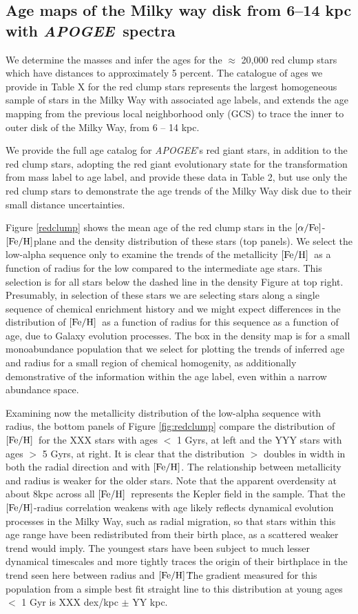 \documentclass[12pt, preprint]{aastex}
\newcommand{\project}[1]{\textsl{#1}}
\newcommand{\apogee}{\project{APOGEE}}
\newcommand{\feh}{\mbox{$\rm [Fe/H]$}}
\newcommand{\alphafe}{\mbox{$\rm [\alpha/Fe]$}}
\begin{document}
\subsection{Age maps of the Milky way disk from 6--14 kpc with \apogee\ spectra}

We determine the masses and infer the ages for the $\approx$ 20,000 red clump stars which have distances to approximately 5 percent. The catalogue of ages we provide in Table X for the red clump stars represents the largest homogeneous sample of stars in the Milky Way with associated age labels, and extends the age mapping from the previous local neighborhood only (GCS) to trace the inner to outer disk of the Milky Way, from 6 -- 14 kpc.  

We provide the full age catalog for \apogee's red giant stars, in addition to the red clump stars, adopting the red giant evolutionary state for the transformation from mass label to age label, and provide these data in Table 2, but use only the red clump stars to demonstrate the age trends of the Milky Way disk due to their small distance uncertainties. 


Figure \ref{redclump} shows the mean age of the red clump stars in the \alphafe-\feh plane and the density distribution of these stars (top panels).  We select the low-alpha sequence only to examine the trends of the metallicity \feh\ as a function of radius for the low compared to the intermediate age stars. This selection is for all stars below the dashed line in the density Figure at top right. Presumably, in selection of these stars we are selecting stars along a single sequence of chemical enrichment history and we might expect differences in the distribution of \feh\ as a function of radius for this sequence as a function of age, due to Galaxy evolution processes. The box in the density map is for a small monoabundance population that we select for plotting the trends of inferred age and radius for a small region of chemical homogenity, as additionally demonstrative of the information within the age label, even within a narrow abundance space. 

Examining now the metallicity distribution of the low-alpha sequence with radius, the bottom panels of Figure \ref{fig:redclump} compare the distribution of \feh\ for the XXX stars with ages $<$ 1 Gyrs, at left and the YYY stars with ages $>$ 5 Gyrs, at right. It is clear that the distribution $>$ doubles in width in both the radial direction and with \feh. The relationship between metallicity and radius is weaker for the older stars. Note that the apparent overdensity at about 8kpc across all \feh\ represents the Kepler field in the sample. That the \feh-radius correlation weakens with age likely reflects dynamical evolution processes in the Milky Way, such as radial migration, so that stars within this age range have been redistributed from their birth place, as a scattered weaker trend would imply. The youngest stars have been subject to much lesser dynamical timescales and more tightly traces the origin of their birthplace in the trend seen here between radius and \feh\. The gradient measured for this population from a simple best fit straight line to this distribution at young ages $<$ 1 Gyr is XXX dex/kpc $\pm$ YY kpc. 
\end{document}
